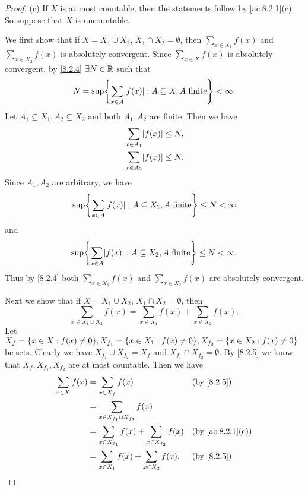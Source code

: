 \begin{proof}{(c)}
  If \(X\) is at most countable, then the statements follow by \cref{ac:8.2.1}(c).
  So suppose that \(X\) is uncountable.

  We first show that if \(X = X_1 \cup X_2\), \(X_1 \cap X_2 = \emptyset\), then \(\sum_{x \in X_1} f(x)\) and \(\sum_{x \in X_2} f(x)\) is absolutely convergent.
  Since \(\sum_{x \in X} f(x)\) is absolutely convergent, by \cref{8.2.4} \(\exists N \in \mathbb{R}\) such that
  \[
    N = \sup\set{\sum_{x \in A} \abs{f(x)} : A \subseteq X, A \text{ finite}} < \infty.
  \]
  Let \(A_1 \subseteq X_1, A_2 \subseteq X_2\) and both \(A_1, A_2\) are finite.
  Then we have
  \begin{align*}
     & \sum_{x \in A_1} \abs{f(x)} \leq N, \\
     & \sum_{x \in A_2} \abs{f(x)} \leq N.
  \end{align*}
  Since \(A_1, A_2\) are arbitrary, we have
  \[
    \sup\set{\sum_{x \in A} \abs{f(x)} : A \subseteq X_1, A \text{ finite}} \leq N < \infty
  \]
  and
  \[
    \sup\set{\sum_{x \in A} \abs{f(x)} : A \subseteq X_2, A \text{ finite}} \leq N < \infty.
  \]
  Thus by \cref{8.2.4} both \(\sum_{x \in X_1} f(x)\) and \(\sum_{x \in X_2} f(x)\) are absolutely convergent.

  Next we show that if \(X = X_1 \cup X_2\), \(X_1 \cap X_2 = \emptyset\), then
  \[
    \sum_{x \in X_1 \cup X_2} f(x) = \sum_{x \in X_1} f(x) + \sum_{x \in X_2} f(x).
  \]
  Let \(X_f = \set{x \in X : f(x) \neq 0}, X_{f_1} = \set{x \in X_1 : f(x) \neq 0}, X_{f_2} = \set{x \in X_2 : f(x) \neq 0}\) be sets.
  Clearly we have \(X_{f_1} \cup X_{f_2} = X_f\) and \(X_{f_1} \cap X_{f_2} = \emptyset\).
  By \cref{8.2.5} we know that \(X_f, X_{f_1}, X_{f_2}\) are at most countable.
  Then we have
  \begin{align*}
    \sum_{x \in X} f(x) & = \sum_{x \in X_f} f(x)                                 &  & \by{8.2.5}                     \\
                        & = \sum_{x \in X_{f_1} \cup X_{f_2}} f(x)                                                    \\
                        & = \sum_{x \in X_{f_1}} f(x) + \sum_{x \in X_{f_2}} f(x) &  & \text{(by \cref{ac:8.2.1}(c))} \\
                        & = \sum_{x \in X_1} f(x) + \sum_{x \in X_2} f(x).        &  & \by{8.2.5}
  \end{align*}


\end{proof}

